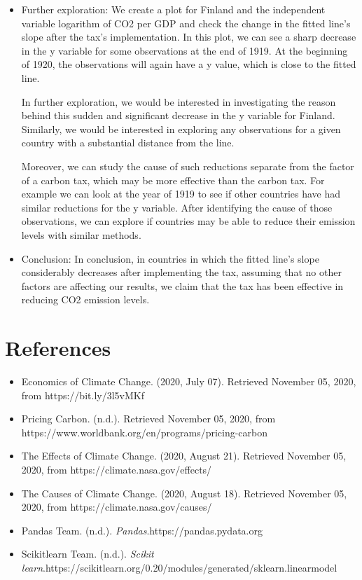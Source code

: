 \documentclass[fontsize=11pt]{article}
\begin{document}
\begin{itemize}
\item Further exploration:
We create a plot for Finland and the independent variable logarithm of CO2 per GDP and check the change in the fitted line's slope after the tax's implementation.
In this plot, we can see a sharp decrease in the y variable for some observations at the end of 1919. At the beginning of 1920, the observations will again have a y value, which is close to the fitted line.

In further exploration, we would be interested in investigating the reason behind this sudden and significant decrease in the y variable for Finland. Similarly, we would be interested in exploring any observations for a given country with a substantial distance from the line.

Moreover, we can study the cause of such reductions separate from the factor of a carbon tax, which may be more effective than the carbon tax. For example we can look at the year of 1919 to see if other countries have had similar reductions for the y variable. After identifying the cause of those observations, we can explore if countries may be able to reduce their emission levels with similar methods.

\item Conclusion: In conclusion, in countries in which the fitted line's slope considerably decreases after implementing the tax, assuming that no other factors are affecting our results, we claim that the tax has been effective in reducing CO2 emission levels.
\end{itemize}

\section*{References}
\begin{itemize}

\item Economics of Climate Change. (2020, July 07). Retrieved November 05, 2020, from https://bit.ly/3l5vMKf

\item Pricing Carbon. (n.d.). Retrieved November 05, 2020, from \\ https://www.worldbank.org/en/programs/pricing-carbon

\item The Effects of Climate Change. (2020, August 21). Retrieved November 05, 2020, from https://climate.nasa.gov/effects/

\item The Causes of Climate Change. (2020, August 18). Retrieved November 05, 2020, from https://climate.nasa.gov/causes/



\item Pandas Team. (n.d.). \emph{Pandas}.https://pandas.pydata.org

\item Scikit\-learn Team. (n.d.). \emph{Scikit learn}.https://scikit\textendash learn.org/0.20/modules/generated/sklearn.linear\textunderscore model\\
\end{itemize}
\end{document}
